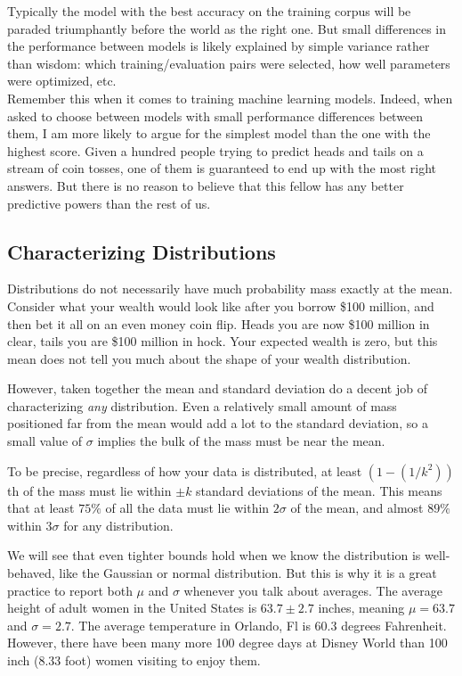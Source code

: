 \documentclass[10pt]{article}
\begin{document}
Typically the model with the best accuracy on the training corpus will be paraded triumphantly before the world as the right one. But small differences in the performance between models is likely explained by simple variance rather than wisdom: which training/evaluation pairs were selected, how well parameters were optimized, etc.\\
Remember this when it comes to training machine learning models. Indeed, when asked to choose between models with small performance differences between them, I am more likely to argue for the simplest model than the one with the highest score. Given a hundred people trying to predict heads and tails on a stream of coin tosses, one of them is guaranteed to end up with the most right answers. But there is no reason to believe that this fellow has any better predictive powers than the rest of us.

\subsection{Characterizing Distributions}
Distributions do not necessarily have much probability mass exactly at the mean. Consider what your wealth would look like after you borrow \$100 million, and then bet it all on an even money coin flip. Heads you are now \$100 million in clear, tails you are \$100 million in hock. Your expected wealth is zero, but this mean does not tell you much about the shape of your wealth distribution.

However, taken together the mean and standard deviation do a decent job of characterizing \textit{any} distribution. Even a relatively small amount of mass positioned far from the mean would add a lot to the standard deviation, so a small value of $\sigma$ implies the bulk of the mass must be near the mean.

To be precise, regardless of how your data is distributed, at least $\left(1-\left(1/k^{2}\right)\right)$th of the mass must lie within $\pm k$ standard deviations of the mean. This means that at least $75\%$ of all the data must lie within $2\sigma$ of the mean, and almost $89\%$ within $3\sigma$ for any distribution.

We will see that even tighter bounds hold when we know the distribution is well-behaved, like the Gaussian or normal distribution. But this is why it is a great practice to report both $\mu$ and $\sigma$ whenever you talk about averages. The average height of adult women in the United States is $63.7 \pm 2.7$ inches, meaning $\mu=63.7$ and $\sigma=2.7$. The average temperature in Orlando, Fl is 60.3 degrees Fahrenheit. However, there have been many more 100 degree days at Disney World than 100 inch (8.33 foot) women visiting to enjoy them.
\end{document}
